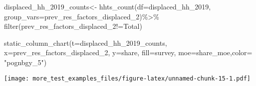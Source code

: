 \documentclass[
]{article}
\newenvironment{Shaded}{\begin{snugshade}}{\end{snugshade}}
\newcommand{\AttributeTok}[1]{\textcolor[rgb]{0.77,0.63,0.00}{#1}}
\newcommand{\FunctionTok}[1]{\textcolor[rgb]{0.00,0.00,0.00}{#1}}
\newcommand{\NormalTok}[1]{#1}
\newcommand{\OtherTok}[1]{\textcolor[rgb]{0.56,0.35,0.01}{#1}}
\newcommand{\SpecialCharTok}[1]{\textcolor[rgb]{0.00,0.00,0.00}{#1}}
\newcommand{\StringTok}[1]{\textcolor[rgb]{0.31,0.60,0.02}{#1}}
\begin{document}
\begin{Shaded}
\begin{Highlighting}[]
\NormalTok{displaced\_hh\_2019\_counts}\OtherTok{\textless{}{-}} \FunctionTok{hhts\_count}\NormalTok{(}\AttributeTok{df=}\NormalTok{displaced\_hh\_2019, }\AttributeTok{group\_vars=}\StringTok{\textquotesingle{}prev\_res\_factors\_displaced\_2\textquotesingle{}}\NormalTok{)}\SpecialCharTok{\%\textgreater{}\%}
\FunctionTok{filter}\NormalTok{(prev\_res\_factors\_displaced\_2}\SpecialCharTok{!=}\StringTok{\textquotesingle{}Total\textquotesingle{}}\NormalTok{)}

\FunctionTok{static\_column\_chart}\NormalTok{(}\AttributeTok{t=}\NormalTok{displaced\_hh\_2019\_counts, }\AttributeTok{x=}\StringTok{\textquotesingle{}prev\_res\_factors\_displaced\_2\textquotesingle{}}\NormalTok{, }\AttributeTok{y=}\StringTok{\textquotesingle{}share\textquotesingle{}}\NormalTok{, }\AttributeTok{fill=}\StringTok{\textquotesingle{}survey\textquotesingle{}}\NormalTok{, }\AttributeTok{moe=}\StringTok{\textquotesingle{}share\_moe\textquotesingle{}}\NormalTok{,}\AttributeTok{color=}  \StringTok{"pognbgy\_5"}\NormalTok{)}
\end{Highlighting}
\end{Shaded}

\texttt{[image: more\_test\_examples\_files/figure-latex/unnamed-chunk-15-1.pdf]}
\end{document}
